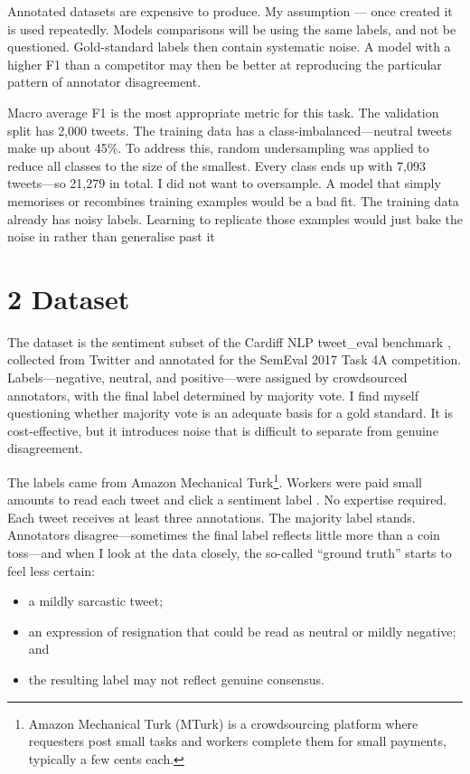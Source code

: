 \documentclass[12pt]{article}
\begin{document}
Annotated datasets are expensive to produce. 
My assumption ---
 once created it is used repeatedly. 
 Models comparisons will be using the same labels, and not be questioned. 
 Gold-standard labels  then contain systematic noise. 
 A model with a higher F1 than a competitor may then
 be better at reproducing the particular pattern 
 of annotator disagreement. 

Macro average F1 is the most appropriate metric for this task. 
The validation split has 2,000 tweets. 
The training data has a class-imbalanced---neutral tweets make up about 45\%. 
To address this, random undersampling was applied to reduce all classes to the size of the smallest. Every class ends up with 7,093 tweets---so 21,279 in total. 
I did not want to oversample.
A model that simply memorises or recombines training examples would be a bad fit.
The training data already has noisy labels. 
Learning to replicate those examples would just bake the noise in rather than generalise past it



\section*{2 Dataset}



The dataset is the sentiment subset of the Cardiff NLP tweet\_eval benchmark \citep{barbieri2020tweeteval}, collected from Twitter and annotated for the SemEval 2017 Task 4A competition.
Labels---negative, neutral, and positive---were assigned by crowdsourced annotators, with the final label determined by majority vote.
I find myself questioning whether majority vote is an adequate basis for a gold standard.
It is cost-effective, but it introduces noise that is difficult to separate from genuine disagreement.

The labels came from Amazon Mechanical Turk\footnote{Amazon Mechanical Turk (MTurk) is a crowdsourcing platform where requesters post small tasks and workers complete them for small payments, typically a few cents each.}.
Workers were paid small amounts to read each tweet and click a sentiment label \citep{rosenthal2017semeval}.
No expertise required.
Each tweet receives at least three annotations.
The majority label stands.
Annotators disagree---sometimes the final label reflects little more than a coin toss---and when I look at the data closely, the so-called ``ground truth'' starts to feel less certain:

\begin{itemize}

  \item a mildly sarcastic tweet;

  \item an expression of resignation that could be read as neutral or mildly negative; and

  \item the resulting label may not reflect genuine consensus.

\end{itemize}
\end{document}
